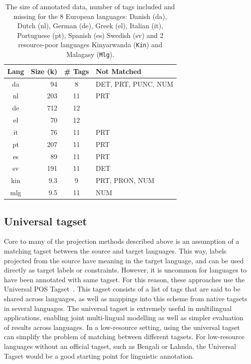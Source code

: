\documentclass[12pt,twoside,final,hidelinks]{ltthesis}
\theoremstyle{definition}
\begin{document}
\begin{table}[t]
\centering
\tabcolsep 3pt
\begin{tabular}{crcl}
\toprule
Lang & Size (k) & \# Tags & Not Matched \\
\midrule
da & 94 & 8 & DET, PRT, PUNC, NUM \\
nl & 203 & 11 & PRT \\
de & 712 & 12 & \\
el & 70 & 12 & \\
it & 76 & 11 & PRT \\
pt & 207 & 11 & PRT \\
es & 89 & 11 & PRT \\
sv & 191 & 11 & DET \\
\midrule
kin & 9.3 & 9 & PRT, PRON, NUM\\
mlg & 9.5 & 11 & NUM \\
\bottomrule
\end{tabular}
\caption[The size of annotated data, number of tags included and missing for all considered languages]{The size of annotated data, number of tags included and missing for the 8 European languages: Danish (da), Dutch (nl), German (de), Greek (el), Italian (it), Portuguese (pt), Spanish (es) Swedish (sv) and 2 resource-poor languages Kinyarwanda (\texttt{Kin}) and Malagasy (\texttt{Mlg}).} 
\label{tab:tagMissing}
\end{table}



\subsection{Universal tagset}
\label{sec:universalTagset}
Core to many of the projection methods described above is an assumption of a matching tagset between the source and target languages. This way, labels projected from the source have meaning in the target language, and can be used directly as target labels or constraints. However, it is uncommon for languages to have been annotated with same tagset. For this reason, these approaches use the Universal POS Tagset~\cite{UniversalTagSet}. This tagset consists of a list of tags that are said to be shared across languages, as well as mappings into this scheme from native tagsets in several languages. The universal tagset is extremely useful in multilingual applications, enabling joint multi-lingual modelling as well as simpler evaluation of results across languages. 
In a low-resource setting, using the universal tagset can simplify the problem of matching between different tagsets. 
For low-resource languages without an official tagset, such as Bengali or Lahnda, the Universal Tagset would be a good starting point for linguistic annotation.
\end{document}
